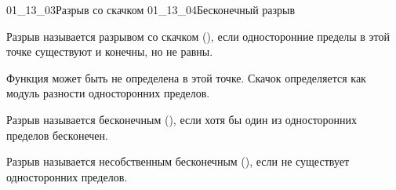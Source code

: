 \gallerydouble
  {01_13_03}{Разрыв со скачком}
  {01_13_04}{Бесконечный разрыв}

\begin{definition}
  Разрыв называется разрывом со скачком (), если односторонние
  пределы в этой точке существуют и конечны, но не равны.
\end{definition}

\begin{remark}
  Функция может быть не определена в этой точке. Скачок определяется как модуль
  разности односторонних пределов.
\end{remark}

\begin{definition}
  Разрыв называется бесконечным (), если хотя бы один из
  односторонних пределов бесконечен.
\end{definition}


\begin{definition}
  Разрыв называется несобственным бесконечным (), если не
  существует односторонних пределов.
\end{definition}
